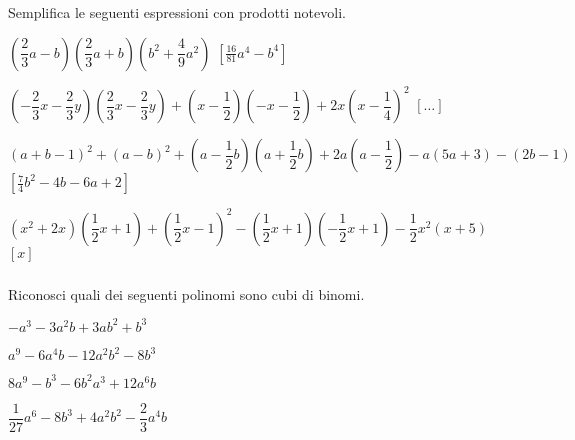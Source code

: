 \begin{esercizio}[\Ast]
 \label{ese:11.23}
Semplifica le seguenti espressioni con prodotti notevoli.

 \begin{enumeratea}
 \item $\left(\dfrac{2}{3}a-b\right)\left(\dfrac{2}{3}a+b\right)
        \left(b^{2}+\dfrac{4}{9}a^{2}\right)$
  \hfill $\left[\frac{16}{81}a^{4}-b^{4}\right]$
 \item $\left(-{\dfrac{2}{3}x-\dfrac{2}{3}y}\right)
        \left(\dfrac{2}{3}x-\dfrac{2}{3}y\right)+\left(x-\dfrac{1}{2}\right)
        \left(-x-\dfrac{1}{2}\right)+2x\left(x-\dfrac{1}{4}\right)^{2}$
  \hfill $\left[ \dots \right]$
 \item $(a+b-1)^{2}+(a-b)^{2}+\left(a-\dfrac{1}{2}b\right)
        \left(a+\dfrac{1}{2}b\right)+2a\left(a-\dfrac{1}{2}\right)-
        a(5a+3)-(2b-1)$
  \hfill $\left[\frac{7}{4}b^{2}-4b-6a+2\right]$
 \item $\left(x^{2}+2x\right)
        \left(\dfrac{1}{2}x+1\right)+\left(\dfrac{1}{2}x-1\right)^{2}-
        \left(\dfrac{1}{2}x+1\right)
        \left(-{\dfrac{1}{2}}x+1\right)-\dfrac{1}{2}x^{2}(x+5)$
  \hfill $\left[x\right]$
\end{enumeratea}
\end{esercizio}

\subsubsection*{}

\begin{esercizio}
 \label{ese:11.24}
Riconosci quali dei seguenti polinomi sono cubi di binomi.
\TabPositions{5cm}
\begin{enumeratea}
 \item $-a^{3}-3a^{2}b+3{ab}^{2}+b^{3}$ \tab\boxSi\quad\boxNo
 \item $a^{9}-6a^{4}b-12a^{2}b^{2}-8b^{3}$ \tab\boxSi\quad\boxNo
 \item $8a^{9}-b^{3}-6b^{2}a^{3}+12a^{6}b$ \tab\boxSi\quad\boxNo
 \item $\dfrac{1}{27}a^{6}-8b^{3}+4a^{2}b^{2}-\dfrac{2}{3}a^{4}b$ 
\tab\boxSi\quad\boxNo
\end{enumeratea}
\end{esercizio}

